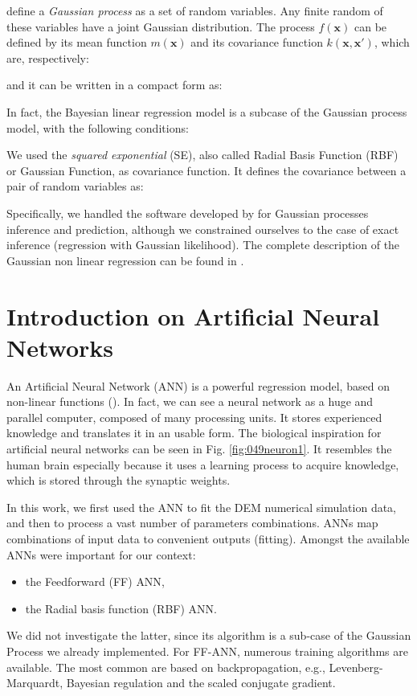 \citet{RefWorks:192} define a \textit{Gaussian process} as a set of random variables. 
Any finite random of these variables have a joint Gaussian distribution.
The process $f(\mathbf{x})$ can be defined by its mean function $m(\mathbf{x})$
and its covariance function $k(\mathbf{x, x'})$, which are, respectively:


and it can be written in a compact form as:

In fact, the Bayesian linear regression model is a subcase of the Gaussian
process model, with the following conditions:

We used the \textit{squared exponential} (SE), also called Radial Basis Function
(\acs{RBF}) or Gaussian Function, as covariance function. It defines the
covariance between a pair of random variables as:


Specifically, we handled the software developed by \citet{RefWorks:192} 
for Gaussian processes inference and prediction, although we constrained ourselves to the case of exact inference
(regression with Gaussian likelihood).
The complete description of the Gaussian non linear regression can be found in
\citet{RefWorks:194}.


\section{Introduction on Artificial Neural Networks}
\label{sec:annintro}
An Artificial Neural Network (\acs{ANN}) is a powerful regression model, 
based on non-linear functions (\citet{RefWorks:158, RefWorks:159}). 
In fact, we can see a neural network as a huge and parallel computer, composed
of many processing units. 
It stores experienced knowledge and translates it in
an usable form. 
The biological inspiration for artificial neural networks can be seen in Fig.
\ref{fig:049neuron1}. 
It resembles the human brain especially because it
uses a learning process to acquire knowledge, which is stored through the
synaptic weights.



In this work, we first used the \acs{ANN} to fit the \acs{DEM} numerical simulation
data, and then to process a vast number of parameters combinations. 
\acs{ANNs} map combinations of input data to convenient outputs (fitting). 
Amongst the available \acs{ANNs} were important for our context: 
\begin{itemize}
  \item {the Feedforward (\acs{FF}) \acs{ANN},}
  \item {the Radial basis function (\acs{RBF}) \acs{ANN}.}	
\end{itemize}
We did not investigate the latter, since its algorithm is a sub-case of the
Gaussian Process we already implemented.
For \acs{FF}-\acs{ANN},
numerous training algorithms are available. 
The most common are based on
backpropagation, e.g., Levenberg-Marquardt, Bayesian regulation and the scaled
conjugate gradient.

